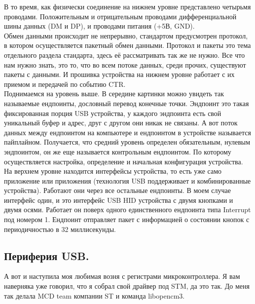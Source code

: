 \documentclass[12pt,a4paper]{article}
\begin{document}
    В то время, как физически соединение на нижнем уровне представлено
    четырьмя проводами. Положительным и отрицательным проводами дифференциальной
    шины данных (DM и DP), и проводами питания (+5В, GND). \\
    Обмен данными происходит не непрерывно, стандартом предусмотрен протокол, в
    котором осуществляется пакетный обмен данными. Протокол и пакеты это
    тема отдельного раздела стандарта, здесь её рассматривать так же не нужно.
    Все что нам нужно знать, это то, что во всем потоке данных, среди прочих,
     существуют пакеты с данными.
    И прошивка устройства на нижнем уровне работает с их приемом и передачей по
    событию CTR.\\
    Поднимаемся на уровень выше. В середине картинки можно увидеть так
    называемые ендпоинты, дословный перевод конечные точки. Эндпоинт это
    такая фиксированная порция USB устройства, у каждого эндпоинта есть свой
    уникальный буфер и адрес, друг с другом они никак не связаны. А вот поток
    данных между ендпоинтом на компьютере и ендпоинтом в устройстве называется
    пайплайном. Получается, что средний уровень определен обязательным, нулевым
    эндпоинтом, он же еще называется контрольным ендпоинтом. По которому
    осуществляется настройка, определение и начальная конфигурация устройства.\\
    На верхнем уровне находится интерфейсы устройства, то есть уже само
    приложение или приложения (технология USB поддерживает и комбинированные
    устройства). Работают они через все остальные ендпоинты. В моем случае интерфейс
    один, и это интерфейс USB HID
    устройства с двумя кнопками и двумя осями. Работает он поверх одного
    единственного ендпоинта типа Interrupt под номером 1.
    Ендпоинт отправляет пакет с информацией о состоянии кнопок
    с периодичностью в 32 миллисекунды.

\subsection{Периферия USB.}
    А вот и наступила моя любимая возня с регистрами микроконтроллера. Я вам
    наверняка уже говорил, что я собрал свой драйвер под STM, да это так. До
    меня так делала MCD team компании ST и команда libopencm3.
\end{document}
